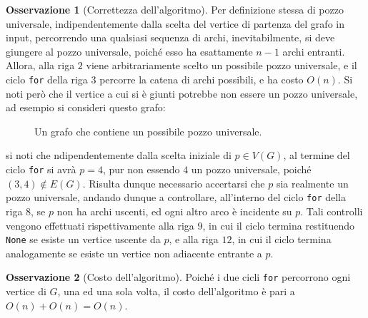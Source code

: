 \documentclass[14pt]{extreport}
\theoremstyle{definition}
\theoremstyle{definition}
\newtheorem{remark}{Osservazione}[subsection]
\begin{document}
\begin{remark}[Correttezza dell'algoritmo]
    Per definizione stessa di pozzo universale, indipendentemente dalla scelta del vertice di partenza del grafo in input, percorrendo una qualsiasi sequenza di archi, inevitabilmente, si deve giungere al pozzo universale, poiché esso ha esattamente $n - 1$ archi entranti. Allora, alla riga $2$ viene arbitrariamente scelto un possibile pozzo universale, e il ciclo \texttt{for} della riga $3$ percorre la catena di archi possibili, e ha costo $O(n)$. Si noti però che il vertice a cui si è giunti potrebbe non essere un pozzo universale, ad esempio si consideri questo grafo:

    \begin{figure}[H]
        \centering
        \caption{Un grafo che contiene un possibile pozzo universale.}
    \end{figure}

    si noti che ndipendentemente dalla scelta iniziale di $p \in V(G)$, al termine del ciclo \texttt{for} si avrà $p = 4$, pur non essendo $4$ un pozzo universale, poiché $(3, 4) \notin E(G)$. Risulta dunque necessario accertarsi che $p$ sia realmente un pozzo universale, andando dunque a controllare, all'interno del ciclo \texttt{for} della riga $8$, se $p$ non ha archi uscenti, ed ogni altro arco è incidente su $p$. Tali controlli vengono effettuati rispettivamente alla riga $9$, in cui il ciclo termina restituendo \texttt{None} se esiste un vertice uscente da $p$, e alla riga $12$, in cui il ciclo termina analogamente se esiste un vertice non adiacente entrante a $p$.
\end{remark}

\begin{remark}[Costo dell'algoritmo]
    Poiché i due cicli \texttt{for} percorrono ogni vertice di $G$, una ed una sola volta, il costo dell'algoritmo è pari a $O(n) + O(n) = O(n)$.
\end{remark}
\end{document}
